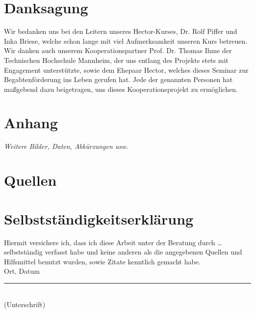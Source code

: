 \section*{Danksagung}

Wir bedanken uns bei den Leitern unseres Hector-Kurses, Dr. Rolf Piffer und Inka Briese, welche schon lange mit viel Aufmerksamkeit unseren Kurs betreuen. Wir danken auch unserem Kooperationspartner Prof. Dr. Thomas Ihme der Technischen Hochschule Mannheim, der uns entlang des Projekts stets mit Engagement unterstützte, sowie dem Ehepaar Hector, welches dieses Seminar zur Begabtenförderung ins Leben gerufen hat. Jede der genannten Personen hat maßgebend dazu beigetragen, uns dieses Kooperationsprojekt zu ermöglichen.

\section{Anhang}

\textit{Weitere Bilder, Daten, Abkürzungen usw.}

\section*{Quellen}
\bib
\appendix

\newpage
\section*{Selbstständigkeitserklärung}
Hiermit versichere ich, dass ich diese Arbeit unter der Beratung durch … selbstständig verfasst habe und keine anderen als die angegebenen Quellen und Hilfsmittel benutzt wurden, sowie Zitate kenntlich gemacht habe. \\[2cm]

Ort, Datum \hfill \rule{5cm}{0.4pt} \\
\hfill (Unterschrift)
	
